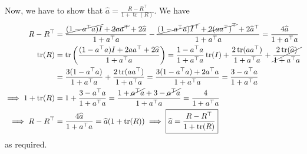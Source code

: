 Now, we have to show that \( \displaystyle \widehat{a} = \frac{R - R^{\top}}{1 + \operatorname{tr}(R)} \).
We have
\begin{align*}
    R - R^\top
     & =
    \frac{\cancel{(1 - a^{\top} a) I} + \cancel{2 a a^{\top}} + 2 \widehat{a}}{1 + a^{\top} a} - \frac{\cancel{(1 - a^{\top} a) I^\top} + \cancel{2 {(a a^{\top})}^\top} + 2 \widehat{a}^\top}{1 + a^{\top} a}
    =
    \frac{4 \widehat{a}}{1 + a^{\top} a}
    \\
    \operatorname{tr}(R)
     & =
    \operatorname{tr}\left( \frac{(1 - a^{\top} a) I + 2 a a^{\top} + 2 \widehat{a}}{1 + a^{\top} a} \right)
    =
    \frac{1 - a^{\top} a}{1 + a^{\top} a} \operatorname{tr}(I) + \frac{2 \operatorname{tr}(a a^{\top})}{1 + a^{\top} a} + \cancel{\frac{2 \operatorname{tr}(\widehat{a})}{1 + a^{\top} a}}
    \\ & =
    \frac{3 (1 - a^{\top} a)}{1 + a^{\top} a} + \frac{2 \operatorname{tr}(a a^{\top})}{1 + a^{\top} a}
    =
    \frac{3 (1 - a^{\top} a) + 2 a^{\top} a}{1 + a^{\top} a}
    =
    \frac{3 - a^{\top} a}{1 + a^{\top} a}
    \\
    \implies
    1 + \operatorname{tr}(R)
     & =
    1 + \frac{3 - a^{\top} a}{1 + a^{\top} a}
    =
    \frac{1 + \cancel{a^{\top} a} + 3 - \cancel{a^{\top} a}}{1 + a^{\top} a}
    =
    \frac{4}{1 + a^{\top} a}
    \\
    \implies
    R - R^\top
     & =
    \frac{4 \widehat{a}}{1 + a^{\top} a}
    =
    \widehat{a} (1 + \operatorname{tr}(R))
    \implies
    \boxed{
        \widehat{a}
        =
        \frac{R - R^\top}{1 + \operatorname{tr}(R)}
    }
\end{align*}
as required.

